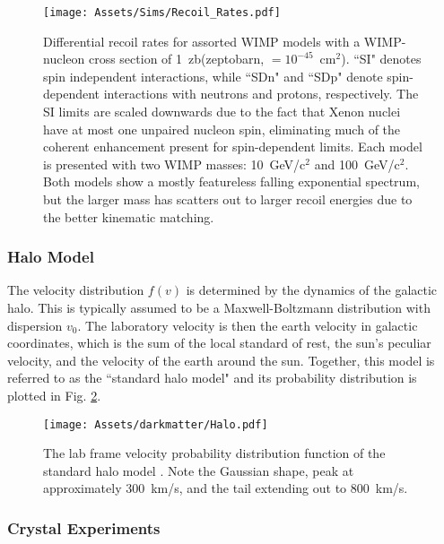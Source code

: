 \begin{figure}
    \centering
    \texttt{[image: Assets/Sims/Recoil\_Rates.pdf]}
    \caption[Differential recoil rates for assorted WIMP models with a WIMP-nucleon cross section of 1~zb.]{Differential recoil rates for assorted WIMP models with a WIMP-nucleon cross section of 1~zb(zeptobarn, $=10^{-45}$~cm$^2$).
    ``SI" denotes spin independent interactions, while ``SDn" and ``SDp" denote spin-dependent interactions with neutrons and protons, respectively.
    The SI limits are scaled downwards due to the fact that Xenon nuclei have at most one unpaired nucleon spin, eliminating much of the coherent enhancement present for spin-dependent limits.
    Each model is presented with two WIMP masses: 10~GeV/c$^2$ and 100~GeV/c$^2$.
    Both models show a mostly featureless falling exponential spectrum, but the larger mass has scatters out to larger recoil energies due to the better kinematic matching.}
    \label{fig:recoil_rates}
\end{figure}

 \subsubsection{Halo Model}
 The velocity distribution $f(v)$ is determined by the dynamics of the galactic halo. 
 This is typically assumed to be a Maxwell-Boltzmann distribution with dispersion $v_0$.
 The laboratory velocity is then the earth velocity in galactic coordinates, which is the sum of the local standard of rest, the sun's peculiar velocity, and the velocity of the earth around the sun. 
 Together, this model is referred to as the ``standard halo model" and its probability distribution is plotted in Fig. \ref{fig:shm}.

\begin{figure}
    \centering
    \texttt{[image: Assets/darkmatter/Halo.pdf]}
    \caption[The lab frame velocity probability distribution function of the standard halo model]%
    {The lab frame velocity probability distribution function of the standard halo model \cite{mccabe_earths_2014, baxter_recommended_2021}.
    Note the Gaussian shape, peak at approximately 300~km/s, and the tail extending out to 800~km/s.
    }
    \label{fig:shm}
\end{figure}

\subsubsection{Crystal Experiments}

